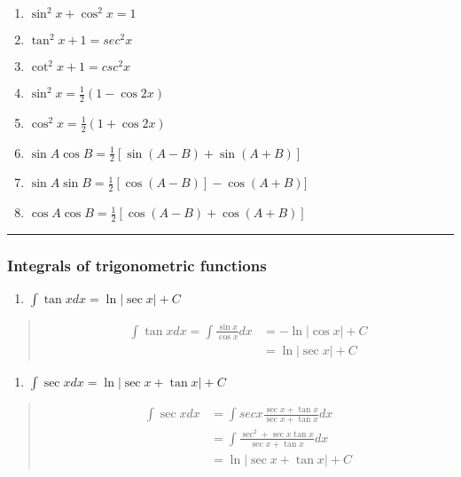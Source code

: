 \documentclass[
]{article}
\providecommand{\tightlist}{%
  \setlength{\itemsep}{0pt}\setlength{\parskip}{0pt}}
\begin{document}
\begin{enumerate}
\def\labelenumi{\arabic{enumi}.}
\item
  \(\displaystyle \sin^2 x + \cos^2 x = 1\)
\item
  \(\displaystyle \tan^2 x + 1 = sec^2 x\)
\item
  \(\displaystyle \cot^2 x + 1 = csc^2 x\)
\item
  \(\displaystyle \sin^2 x = \frac{1}{2}(1-\cos 2x)\)
\item
  \(\displaystyle \cos^2 x = \frac{1}{2}(1+\cos 2x)\)
\item
  \(\displaystyle \sin A\cos B = \frac{1}{2}[\sin(A-B)+\sin(A+B)]\)
\item
  \(\displaystyle \sin A\sin B = \frac{1}{2}[\cos(A-B) ]- \cos(A+B)]\)
\item
  \(\displaystyle \cos A\cos B = \frac{1}{2}[\cos(A-B)+\cos(A+B)]\)
\end{enumerate}

\begin{center}\rule{0.5\linewidth}{0.5pt}\end{center}

\hypertarget{integrals-of-trigonometric-functions}{%
\subsubsection{Integrals of trigonometric
functions}\label{integrals-of-trigonometric-functions}}

\begin{enumerate}
\def\labelenumi{\arabic{enumi}.}
\tightlist
\item
  \(\displaystyle \int \tan x dx = \ln |\sec x| +C\)
\end{enumerate}

\begin{quote}
\begin{align*}
\int \tan x dx = \int \frac{\sin x}{\cos x} dx &= -\ln|\cos x| + C\\
&= \ln|\sec x| + C
\end{align*}
\end{quote}

\begin{enumerate}
\def\labelenumi{\arabic{enumi}.}
\setcounter{enumi}{1}
\tightlist
\item
  \(\displaystyle \int \sec x dx = \ln|\sec x + \tan x| + C\)
\end{enumerate}

\begin{quote}
\begin{align*}
\int \sec x dx &= \int sec x \frac{\sec x + \tan x}{\sec x + \tan x} dx\\
&= \int \frac{\sec^2 + \sec x\tan x}{\sec x + \tan x}dx\\
&= \ln |\sec x + \tan x| + C
\end{align*}
\end{quote}
\end{document}
